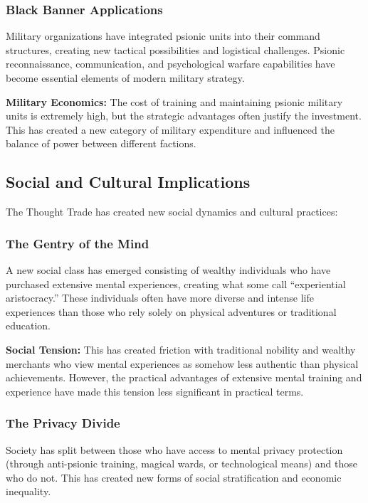 \documentclass[11pt,twoside]{article}
\begin{document}
\subsubsection{Black Banner Applications}
Military organizations have integrated psionic units into their command structures, creating new tactical possibilities and logistical challenges. Psionic reconnaissance, communication, and psychological warfare capabilities have become essential elements of modern military strategy.

\textbf{Military Economics:} The cost of training and maintaining psionic military units is extremely high, but the strategic advantages often justify the investment. This has created a new category of military expenditure and influenced the balance of power between different factions.

\subsection{Social and Cultural Implications}

The Thought Trade has created new social dynamics and cultural practices:

\subsubsection{The Gentry of the Mind}
A new social class has emerged consisting of wealthy individuals who have purchased extensive mental experiences, creating what some call ``experiential aristocracy.'' These individuals often have more diverse and intense life experiences than those who rely solely on physical adventures or traditional education.

\textbf{Social Tension:} This has created friction with traditional nobility and wealthy merchants who view mental experiences as somehow less authentic than physical achievements. However, the practical advantages of extensive mental training and experience have made this tension less significant in practical terms.

\subsubsection{The Privacy Divide}
Society has split between those who have access to mental privacy protection (through anti-psionic training, magical wards, or technological means) and those who do not. This has created new forms of social stratification and economic inequality.
\end{document}
